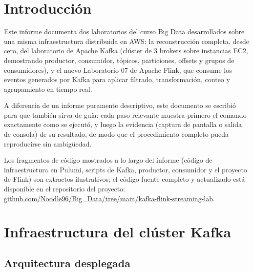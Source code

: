 %

\section{Introducción}

	Este informe documenta dos laboratorios del curso Big Data desarrollados sobre una misma infraestructura distribuida en AWS: la reconstrucción completa, desde cero, del laboratorio de Apache Kafka (clúster de 3 brokers sobre instancias EC2, demostrando productor, consumidor, tópicos, particiones, offsets y grupos de consumidores), y el nuevo Laboratorio 07 de Apache Flink, que consume los eventos generados por Kafka para aplicar filtrado, transformación, conteo y agrupamiento en tiempo real.

	A diferencia de un informe puramente descriptivo, este documento se escribió para que también sirva de guía: cada paso relevante muestra primero el comando exactamente como se ejecutó, y luego la evidencia (captura de pantalla o salida de consola) de su resultado, de modo que el procedimiento completo pueda reproducirse sin ambigüedad.

	Los fragmentos de código mostrados a lo largo del informe (código de infraestructura en Pulumi, scripts de Kafka, productor, consumidor y el proyecto de Flink) son extractos ilustrativos; el código fuente completo y actualizado está disponible en el repositorio del proyecto: \href{https://github.com/Noodle96/Big_Data/tree/main/kafka-flink-streaming-lab}{github.com/Noodle96/Big\_Data/tree/main/kafka-flink-streaming-lab}.


\section{Infraestructura del clúster Kafka}

	\subsection{Arquitectura desplegada}

